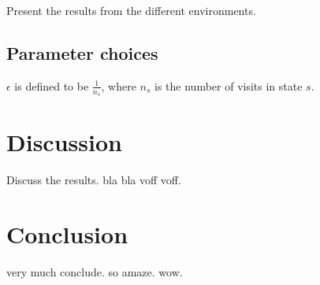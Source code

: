\documentclass[11pt]{article}
\numberwithin{equation}{section}
\begin{document}
\begin{flushleft}
Present the results from the different environments.

\subsection{Parameter choices}

$\epsilon$ is defined to be $\frac{1}{n_s}$, where $n_s$ is the number of visits in state $s$.

\section{Discussion}

Discuss the results. bla bla voff voff.

\section{Conclusion}

very much conclude. so amaze. wow.

\end{flushleft}
\end{document}
